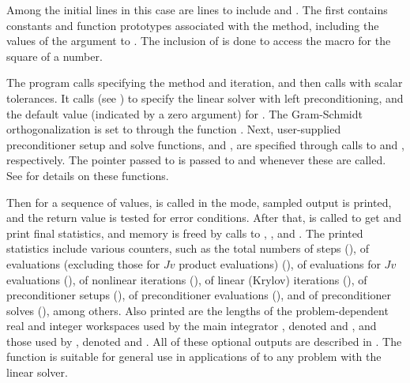 Among the initial  lines in this case are lines to
include  and .  The first contains
constants and function prototypes associated with the {\spgmr} method,
including the values of the  argument to .
The inclusion of  is done to access the 
macro for the square of a  number.

The  program calls  specifying the  method
and  iteration, and then calls  with scalar
tolerances.   
It calls   (see ) to specify the {\cvspgmr} 
linear solver with left preconditioning, and the default value (indicated by a zero argument)
for .  The Gram-Schmidt orthogonalization is set to 
through the function .  Next, user-supplied preconditioner
setup and solve functions,  and , are specified through
calls to  and , respectively.
The  pointer passed to  is passed to
 and  whenever these are called.  See
 for details on these  functions.

Then for a sequence of  values,  is called in the
 mode, sampled output is printed, and the return value is
tested for error conditions.  After that,  is called
to get and print final statistics, and memory is freed by calls to
, , and .  The printed
statistics include various counters, such as the total numbers of steps
(), of  evaluations (excluding those for $Jv$ product
evaluations) (), of  evaluations for $Jv$ evaluations (),
of nonlinear iterations (), of linear (Krylov) iterations (),
of preconditioner setups (), of preconditioner evaluations
(), and of preconditioner solves (), among others.  
Also printed are the lengths of the problem-dependent real and integer
workspaces used by the main integrator , denoted  and
, and those used by {\cvspgmr}, denoted  and .
All of these optional outputs are described in .
The  function is suitable for general use in applications
of {\cvode} to any problem with the {\spgmr} linear solver.

